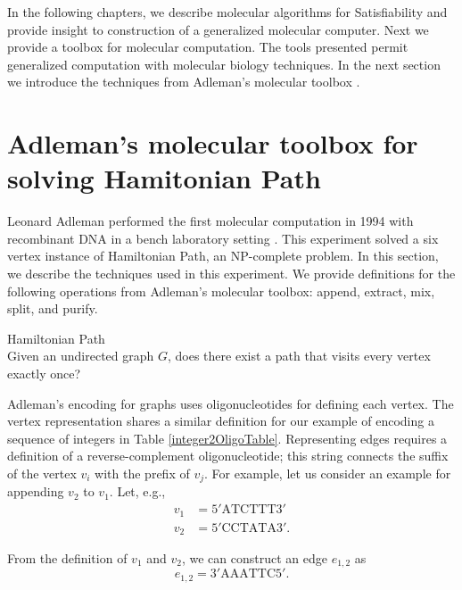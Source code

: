In the following chapters, we describe molecular algorithms for {\sc Satisfiability} and provide insight to construction of a generalized molecular computer.  Next we provide a toolbox for molecular computation.  The tools presented permit generalized computation with molecular biology techniques.  In the next section we introduce the techniques from Adleman's molecular toolbox \cite{Adleman:1994:MCS:189441.189442}.

\section{Adleman's molecular toolbox for solving {\sc Hamitonian Path}}
	
Leonard Adleman performed the first molecular computation in 1994 with recombinant DNA in a bench laboratory setting \cite{Adleman:1994:MCS:189441.189442}.  This experiment solved a six vertex instance of {\sc Hamiltonian Path}, an \textsf{NP-complete} problem.  In this section, we describe the techniques used in this experiment. We provide definitions for the following operations from Adleman's molecular toolbox: append, extract, mix, split, and purify.

\begin{definition}
{\sc Hamiltonian Path} \\
Given an undirected graph $G$, does there exist a path that visits every vertex exactly once?

\end{definition}

%


Adleman's encoding for graphs uses oligonucleotides for defining each vertex.  The vertex representation shares a similar definition for our example of encoding a sequence of integers in Table \ref{integer2OligoTable}.  Representing edges requires a definition of a reverse-complement oligonucleotide; this string connects the suffix of the vertex $v_i$ with the prefix of $v_j$.  For example, let us consider an example for appending $v_2$ to $v_1$.  Let, e.g.,
\begin{align*}
 v_1 &= 5'\text{ATCTTT}3' \\
 v_2 &= 5'\text{CCTATA}3'.
\end{align*}

\noindent From the definition of $v_1$ and $v_2$, we can construct an edge $e_{1,2}$ as
\[
e_{1,2} = 3'\text{AAATTC}5'.
\]

